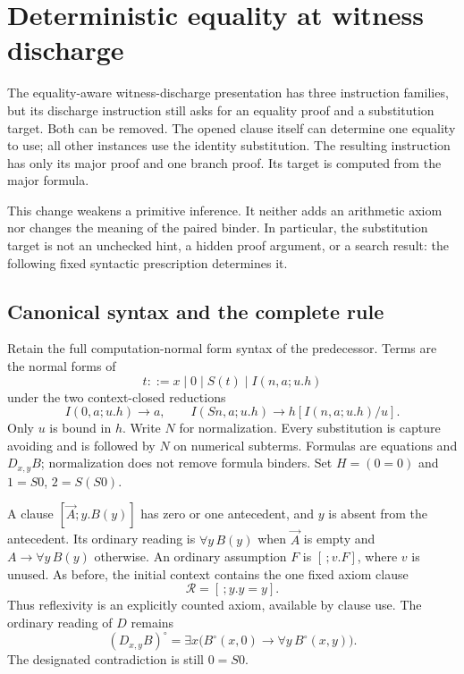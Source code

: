 
\section{Deterministic equality at witness discharge}
\label{dd:main}

The equality-aware witness-discharge presentation has three instruction
families, but its discharge instruction still asks for an equality proof and
a substitution target.  Both can be removed.  The opened clause itself can
determine one equality to use; all other instances use the identity
substitution.  The resulting instruction has only its major proof and one
branch proof.  Its target is computed from the major formula.

This change weakens a primitive inference.  It neither adds an arithmetic
axiom nor changes the meaning of the paired binder.  In particular, the
substitution target is not an unchecked hint, a hidden proof argument, or a
search result: the following fixed syntactic prescription determines it.

\subsection{Canonical syntax and the complete rule}

Retain the full computation-normal form syntax of the predecessor.  Terms
are the normal forms of
\[
 t ::= x\mid 0\mid S(t)\mid I(n,a;u.h)
\]
under the two context-closed reductions
\[
 I(0,a;u.h)\longrightarrow a,
 \qquad
 I(Sn,a;u.h)\longrightarrow h[I(n,a;u.h)/u].
\]
Only $u$ is bound in $h$.  Write $N$ for normalization.  Every substitution
is capture avoiding and is followed by $N$ on numerical subterms.  Formulas
are equations and $D_{x,y}B$; normalization does not remove formula binders.
Set $H=(0=0)$ and $1=S0$, $2=S(S0)$.

A clause $[\vec A;y.B(y)]$ has zero or one antecedent, and $y$ is absent
from the antecedent.  Its ordinary reading is $\forall y\,B(y)$ when
$\vec A$ is empty and $A\to\forall y\,B(y)$ otherwise.  An ordinary
assumption $F$ is $[\,;v.F]$, where $v$ is unused.  As before, the initial
context contains the one fixed axiom clause
\[
             \mathcal R=[\,;y.y=y].
\]
Thus reflexivity is an explicitly counted axiom, available by clause use.
The ordinary reading of $D$ remains
\[
 (D_{x,y}B)^{\circ}
   =\exists x\bigl(B^{\circ}(x,0)\to
                       \forall y\,B^{\circ}(x,y)\bigr).
\]
The designated contradiction is still $0=S0$.

